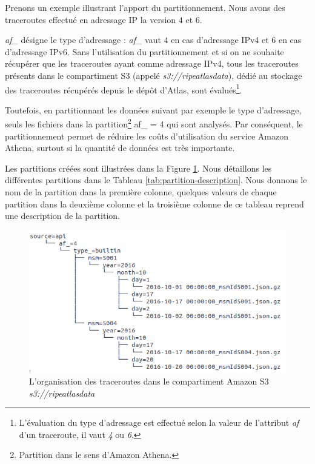 Prenons un exemple illustrant l'apport du partitionnement. Nous avons des traceroutes effectué en adressage IP la version  $ 4 $ et $ 6 $.


\textit{af\_} désigne le type d'adressage : \textit{af\_} vaut $4$ en cas d'adressage IPv4 et $6$ en cas d'adressage IPv6. Sans l'utilisation du partitionnement et si on ne souhaite récupérer que  les traceroutes ayant comme adressage IPv4, tous les traceroutes présents dans le compartiment S3 (appelé \textit{s3://ripeatlasdata}), dédié au stockage des traceroutes récupérés depuis le dépôt d'Atlas, sont évalués\footnote{L'évaluation du type  d'adressage est effectué selon la valeur de l'attribut \textit{af} d'un traceroute, il vaut \textit{4} ou \textit{6}.}.

Toutefois, en partitionnant les données suivant par exemple le type d'adressage, seuls les fichiers dans la partition\footnote{Partition dans le sens d'Amazon Athena.} af\_ = 4 qui sont analysés. Par conséquent, le partitionnement permet de réduire les coûts d'utilisation du service Amazon Athena, surtout si la quantité de données est très importante. 


Les partitions   créées sont illustrées  dans la Figure 	\ref{fig:partitionnement-athenaa}. Nous détaillons les différentes partitions dans le Tableau \ref{tab:partition-description}. Nous donnons le nom de la partition dans la première colonne, quelques valeurs de chaque partition dans la deuxième colonne et la troisième colonne de ce tableau reprend une description de la partition.

\begin{figure}[H]
	\centering
	\captionsetup{justification=centering}
	\includegraphics[width=1\linewidth]{illustrations/partitionnement-athena}
	\caption{L'organisation des traceroutes dans le compartiment Amazon S3 \textit{s3://ripeatlasdata}}
	\label{fig:partitionnement-athenaa}
\end{figure}

